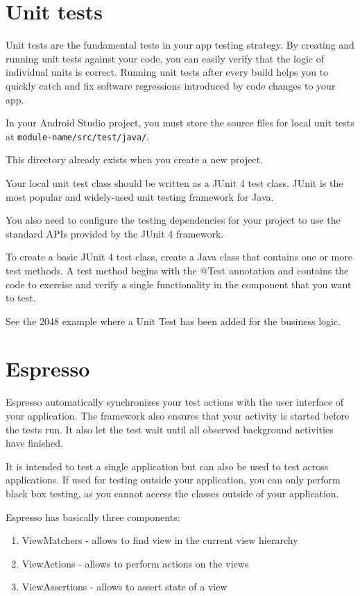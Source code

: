 \section{Unit tests}
Unit tests are the fundamental tests in your app testing strategy. By creating and running unit tests against your code, you can easily verify that the logic of individual units is correct. Running unit tests after every build helps you to quickly catch and fix software regressions introduced by code changes to your app.

In your Android Studio project, you must store the source files for local unit tests at
\texttt{module-name/src/test/java/}. 
 
 This directory already exists when you create a new project.
 
 Your local unit test class should be written as a JUnit 4 test class. JUnit is the most popular and widely-used unit testing framework for Java. 

You also need to configure the testing dependencies for your project to use the standard APIs provided by the JUnit 4 framework.

To create a basic JUnit 4 test class, create a Java class that contains one or more test methods. A test method begins with the @Test annotation and contains the code to exercise and verify a single functionality in the component that you want to test.

See the 2048 example where a Unit Test has been added for the business logic.

\section{Espresso}
Espresso automatically synchronizes your test actions with the user interface of your application. The framework also ensures that your activity is started before the tests run. It also let the test wait until all observed background activities have finished.

It is intended to test a single application but can also be used to test across applications. If used for testing outside your application, you can only perform black box testing, as you cannot access the classes outside of your application.

Espresso has basically three components:

\begin{enumerate}
	\item ViewMatchers - allows to find view in the current view hierarchy
	
	\item ViewActions - allows to perform actions on the views
	
	\item ViewAssertions - allows to assert state of a view
\end{enumerate}

